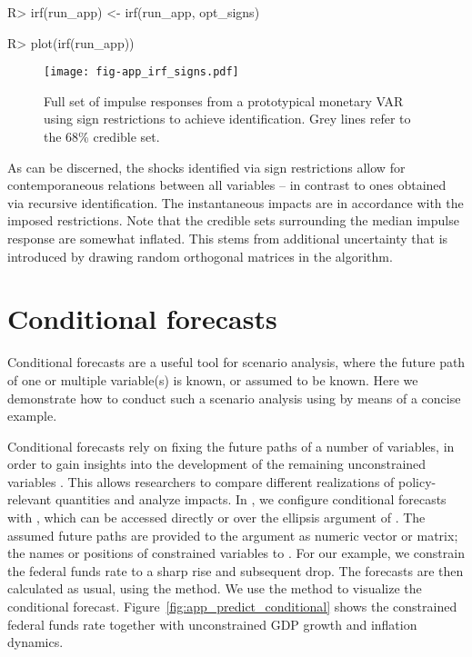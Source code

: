 \documentclass[article,nojss]{jss} %
\begin{document}
\begin{appendix}
\begin{Schunk}
\begin{Sinput}
R> irf(run_app) <- irf(run_app, opt_signs)
\end{Sinput}
\end{Schunk}
\begin{Schunk}
\begin{Sinput}
R> plot(irf(run_app))
\end{Sinput}
\end{Schunk}

\begin{figure}[ht!]
	\centering
  \texttt{[image: fig-app\_irf\_signs.pdf]}
	\caption{Full set of impulse responses from a prototypical monetary VAR using sign restrictions to achieve identification. Grey lines refer to the 68\% credible set.}
	\label{fig:app_irf_signs}
\end{figure}

As can be discerned, the shocks identified via sign restrictions allow for contemporaneous relations between all variables -- in contrast to ones obtained via recursive identification.
The instantaneous impacts are in accordance with the imposed restrictions. Note that the credible sets surrounding the median impulse response are somewhat inflated. This stems from additional uncertainty that is introduced by drawing random orthogonal matrices in the algorithm.


\section{Conditional forecasts}\label{app:cond}

Conditional forecasts are a useful tool for scenario analysis, where the future path of one or multiple variable(s) is known, or assumed to be known. Here we demonstrate how to conduct such a scenario analysis using  by means of a concise example.

Conditional forecasts rely on fixing the future paths of a number of variables, in order to gain insights into the development of the remaining unconstrained variables \citep{waggoner1999}. This allows researchers to compare different realizations of policy-relevant quantities and analyze impacts.
In , we configure conditional forecasts with , which can be accessed directly or over the ellipsis argument of . The assumed future paths are provided to the  argument as numeric vector or matrix; the names or positions of constrained variables to . For our example, we constrain the federal funds rate to a sharp rise and subsequent drop. The forecasts are then calculated as usual, using the  method.
We use the  method to visualize the conditional forecast. Figure~\ref{fig:app_predict_conditional} shows the constrained federal funds rate together with unconstrained GDP growth and inflation dynamics.


\end{appendix}
\end{document}
